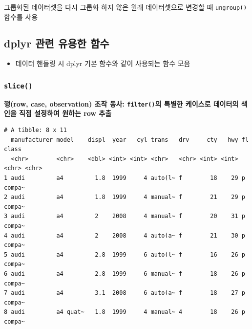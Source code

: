 \documentclass[
  11pt,
]{krantz}
\makeatletter
\newenvironment{Shaded}{\begin{snugshade}}{\end{snugshade}}
\newcommand{\CommentTok}[1]{\textcolor[rgb]{0.37,0.37,0.37}{\textit{#1}}}
\newcommand{\DecValTok}[1]{\textcolor[rgb]{0.06,0.06,0.06}{#1}}
\newcommand{\KeywordTok}[1]{\textcolor[rgb]{0.27,0.27,0.27}{\textbf{#1}}}
\newcommand{\NormalTok}[1]{#1}
\newcommand{\OperatorTok}[1]{\textcolor[rgb]{0.43,0.43,0.43}{\textbf{#1}}}
\newcommand{\StringTok}[1]{\textcolor[rgb]{0.5,0.5,0.5}{#1}}
\providecommand{\tightlist}{%
  \setlength{\itemsep}{0pt}\setlength{\parskip}{0pt}}
\newenvironment{kframe}{%
\medskip{}
\setlength{\fboxsep}{.8em}
 \def\at@end@of@kframe{}%
 \ifinner\ifhmode%
  \def\at@end@of@kframe{\end{minipage}}%
  \begin{minipage}{\columnwidth}%
 \fi\fi%
 \def\FrameCommand##1{\hskip\@totalleftmargin \hskip-\fboxsep
 \colorbox{shadecolor}{##1}\hskip-\fboxsep
     \hskip-\linewidth \hskip-\@totalleftmargin \hskip\columnwidth}%
 \MakeFramed {\advance\hsize-\width
   \@totalleftmargin\z@ \linewidth\hsize
   \@setminipage}}%
 {\par\unskip\endMakeFramed%
 \at@end@of@kframe}
\newenvironment{rmdblock}[1]
  {
  \begin{itemize}
  \renewcommand{\labelitemi}{
    \raisebox{-.7\height}[0pt][0pt]{
      {\setkeys{Gin}{width=3em,keepaspectratio}\texttt{[image: images/\#1]}}
    }
  }
  \setlength{\fboxsep}{1em}
  \begin{kframe}
  \item
  }
  {
  \end{kframe}
  \end{itemize}
  }
\newenvironment{rmdtip}
  {\begin{rmdblock}{tip}}
  {\end{rmdblock}}
\renewenvironment{quote}{\begin{kframe}}{\end{kframe}}
\makeatother
\begin{document}
\normalsize

\footnotesize

\begin{rmdtip}
\begin{rmdtip}

그룹화된 데이터셋을 다시 그룹화 하지 않은 원래 데이터셋으로 변경할 때 \texttt{ungroup()} 함수를 사용

\end{rmdtip}
\end{rmdtip}

\normalsize

\hypertarget{dplyr-application}{%
\subsection{dplyr 관련 유용한 함수}\label{dplyr-application}}

\begin{itemize}
\tightlist
\item
  데이터 핸들링 시 dplyr 기본 함수와 같이 사용되는 함수 모음
\end{itemize}

\hypertarget{dplyr-slice}{%
\subsubsection*{\texorpdfstring{\texttt{slice()}}{slice()}}\label{dplyr-slice}}


\begin{quote}
\textbf{행(row, case, observation) 조작 동사: \texttt{filter()}의 특별한 케이스로 데이터의 색인을 직접 설정하여 원하는 row 추출}
\end{quote}

\footnotesize

\begin{Shaded}
\end{Shaded}

\begin{verbatim}
# A tibble: 8 x 11
  manufacturer model    displ  year   cyl trans   drv     cty   hwy fl    class 
  <chr>        <chr>    <dbl> <int> <int> <chr>   <chr> <int> <int> <chr> <chr> 
1 audi         a4         1.8  1999     4 auto(l~ f        18    29 p     compa~
2 audi         a4         1.8  1999     4 manual~ f        21    29 p     compa~
3 audi         a4         2    2008     4 manual~ f        20    31 p     compa~
4 audi         a4         2    2008     4 auto(a~ f        21    30 p     compa~
5 audi         a4         2.8  1999     6 auto(l~ f        16    26 p     compa~
6 audi         a4         2.8  1999     6 manual~ f        18    26 p     compa~
7 audi         a4         3.1  2008     6 auto(a~ f        18    27 p     compa~
8 audi         a4 quat~   1.8  1999     4 manual~ 4        18    26 p     compa~
\end{verbatim}
\end{document}
